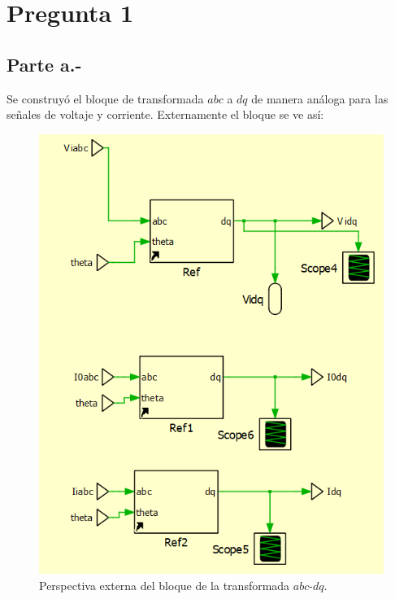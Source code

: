 %
%


\newcommand{\explorelite}{\textit{explore\_lite}}
\newcommand{\movebase}{\textit{move\_base}}

\section{Pregunta 1}

\subsection{Parte a.-}

Se construyó el bloque de transformada $abc$ a $dq$ de manera análoga para las señales de voltaje y corriente. Externamente el bloque se ve así:

\begin{figure}
    \centering
    \includegraphics[width=0.5\linewidth]{Tarea 1/report/imagenes/p1a/transformadaporfuera.png}
    \caption{Perspectiva externa del bloque de la transformada $abc$-$dq$.}
    \label{transformadaporfuera}
\end{figure}

